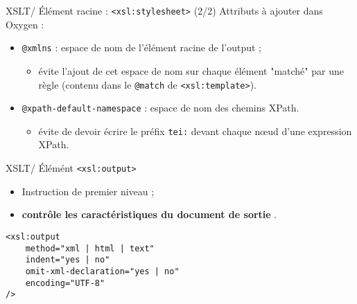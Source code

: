 \documentclass{beamer}
\begin{document}
    \begin{frame}{XSLT/ Élément racine : \texttt{<xsl:stylesheet>} (2/2)}
    \Large
    Attributs à ajouter dans Oxygen :
    \bigskip
        \begin{itemize}
            \item \texttt{@xmlns} : espace de nom de l'élément racine de l'output ;
            \begin{itemize}
            \large
                \item évite l'ajout de cet espace de nom sur chaque élément "matché" par une règle (contenu dans le \texttt{@match} de \texttt{<xsl:template>}).
            \end{itemize}
            \bigskip
            \item \texttt{@xpath-default-namespace} :  espace de nom des chemins XPath.
            \begin{itemize}
            \large
                \item évite de devoir écrire le préfix \texttt{tei:} devant chaque n\oe ud d'une expression XPath.
            \end{itemize}
        \end{itemize}
    \end{frame}

    \begin{frame}[fragile]{XSLT/ Élémént \texttt{<xsl:output>}}
    \Large
        \begin{itemize}
            \item Instruction de premier niveau ;
            \item \og \textbf{contrôle les caractéristiques du document de sortie} \fg.
        \end{itemize}

        \begin{verbatim}
<xsl:output
    method="xml | html | text"
    indent="yes | no"
    omit-xml-declaration="yes | no"
    encoding="UTF-8"
/>
        \end{verbatim}
    \end{frame}
\end{document}
